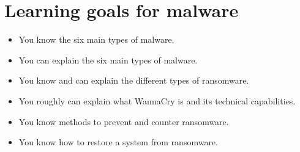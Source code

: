 \section{Learning goals for malware}

\begin{itemize}
    \item You know the six main types of malware.
    \item You can explain the six main types of malware.
    \item You know and can explain the different types of ransomware.
    \item You roughly can explain what WannaCry is and its technical capabilities.
    \item You know methods to prevent and counter ransomware. 
    \item You know how to restore a system from ransomware.
\end{itemize}
